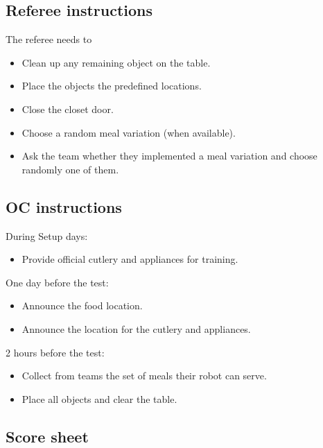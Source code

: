 
\subsection{Referee instructions}

The referee needs to
\begin{itemize}
	\item Clean up any remaining object on the table.
	\item Place the objects the predefined locations.
	\item Close the closet door.
	\item Choose a random meal variation (when available).
	\item Ask the team whether they implemented a meal variation and choose randomly one of them.
\end{itemize}

\subsection{OC instructions}
During Setup days:
\begin{itemize}
	\item Provide official cutlery and appliances for training.
\end{itemize}

One day before the test:
\begin{itemize}
	\item Announce the food location.
	\item Announce the location for the cutlery and appliances.
\end{itemize}

2 hours before the test:
\begin{itemize}
	\item Collect from teams the set of meals their robot can serve.
	\item Place all objects and clear the table.
\end{itemize}

\newpage
\subsection{Score sheet}


